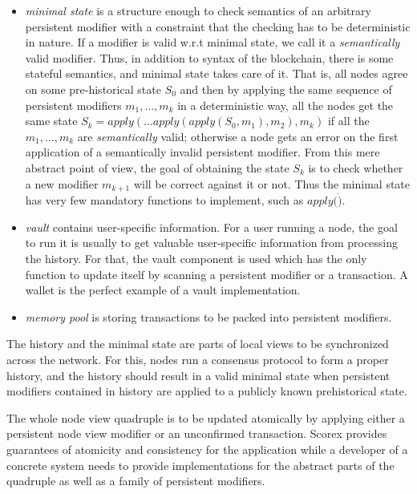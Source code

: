 \begin{itemize}
\item{\em minimal state} is a structure enough to check semantics of an arbitrary persistent modifier with a constraint that the checking has to be deterministic in nature. If a modifier is valid w.r.t minimal state, we call it a {\em semantically} valid modifier.
Thus, in addition to syntax of the blockchain, there is some stateful semantics, and minimal state takes care of it. That is, all nodes agree on some pre-historical state $S_0$ and then by applying the same sequence of persistent modifiers $m_1, \ldots, m_k$ in a deterministic way, all the nodes get the same state $S_k = apply(\ldots apply(apply(S_0, m_1), m_2), m_k)$ if all the $m_1, \ldots, m_k$ are {\em semantically} valid; otherwise a node gets an error on the first application of a semantically invalid persistent modifier. From this mere abstract point of view, the goal of obtaining the state $S_k$ is to check whether a new modifier $m_{k+1}$ will be correct against it or not. Thus the minimal state has very few mandatory functions to implement, such as $apply(\dot)$.

\item{\em vault} contains user-specific information. For a user running a node, the goal to run it is usually to get valuable user-specific information from processing the history. For that, the vault component is used which has the only function to update itself by scanning a persistent modifier or a transaction. A wallet is the perfect example of a vault implementation. 

\item{\em memory pool} is storing transactions to be packed into persistent modifiers.
\end{itemize}

The history and the minimal state are parts of local views to be synchronized across the network. For this, nodes run a consensus protocol to form a proper history, and the history should result in a valid minimal state when persistent modifiers contained in history are applied to a publicly known prehistorical state.

The whole node view quadruple is to be updated atomically by applying either a persistent node view modifier or an unconfirmed transaction. Scorex provides guarantees of atomicity and consistency for the application while a developer of a concrete system needs to provide implementations for the abstract parts of the quadruple as well as a family of persistent modifiers.

